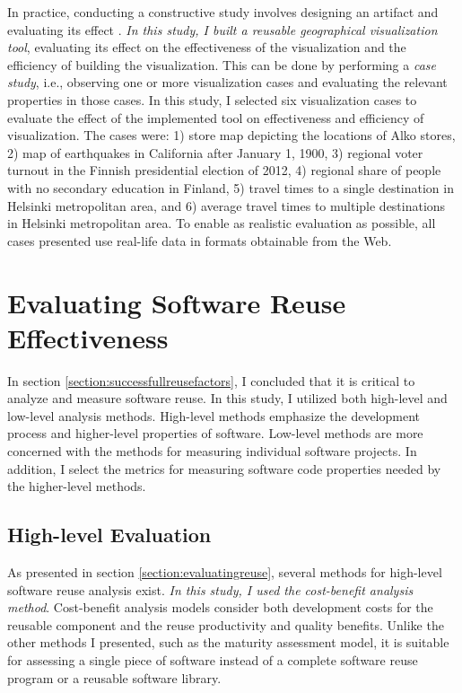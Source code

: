 In practice, conducting a constructive study involves designing an artifact and evaluating its effect \citep{jarvinen_tutkimustyon_2012}. \emph{In this study, I built a reusable geographical visualization tool}, evaluating its effect on the effectiveness of the visualization and the efficiency of building the visualization. This can be done by performing a \emph{case study}, i.e., observing one or more visualization cases and evaluating the relevant properties in those cases. In this study, I selected six visualization cases to evaluate the effect of the implemented tool on effectiveness and efficiency of visualization. The cases were: 1) store map depicting the locations of Alko stores, 2) map of earthquakes in California after January 1, 1900, 3) regional voter turnout in the Finnish presidential election of 2012, 4) regional share of people with no secondary education in Finland, 5) travel times to a single destination in Helsinki metropolitan area, and 6) average travel times to multiple destinations in Helsinki metropolitan area. To enable as realistic evaluation as possible, all cases presented use real-life data in formats obtainable from the Web.

\section{Evaluating Software Reuse Effectiveness}

In section \ref{section:successfullreusefactors}, I concluded that it is critical to analyze and measure software reuse. In this study, I utilized both high-level and low-level analysis methods. High-level methods emphasize the development process and higher-level properties of software. Low-level methods are more concerned with the methods for measuring individual software projects. In addition, I select the metrics for measuring software code properties needed by the higher-level methods.

\subsection{High-level Evaluation}
As presented in section \ref{section:evaluatingreuse}, several methods for high-level software reuse analysis exist. \emph{In this study, I used the cost-benefit analysis method}. Cost-benefit analysis models consider both development costs for the reusable component and the reuse productivity and quality benefits. Unlike the other methods I presented, such as the maturity assessment model, it is suitable for assessing a single piece of software instead of a complete software reuse program or a reusable software library.

